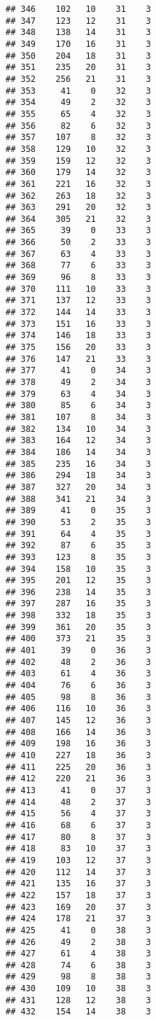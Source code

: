 \documentclass[
]{article}
\begin{document}
\begin{verbatim}
## 346    102   10    31    3
## 347    123   12    31    3
## 348    138   14    31    3
## 349    170   16    31    3
## 350    204   18    31    3
## 351    235   20    31    3
## 352    256   21    31    3
## 353     41    0    32    3
## 354     49    2    32    3
## 355     65    4    32    3
## 356     82    6    32    3
## 357    107    8    32    3
## 358    129   10    32    3
## 359    159   12    32    3
## 360    179   14    32    3
## 361    221   16    32    3
## 362    263   18    32    3
## 363    291   20    32    3
## 364    305   21    32    3
## 365     39    0    33    3
## 366     50    2    33    3
## 367     63    4    33    3
## 368     77    6    33    3
## 369     96    8    33    3
## 370    111   10    33    3
## 371    137   12    33    3
## 372    144   14    33    3
## 373    151   16    33    3
## 374    146   18    33    3
## 375    156   20    33    3
## 376    147   21    33    3
## 377     41    0    34    3
## 378     49    2    34    3
## 379     63    4    34    3
## 380     85    6    34    3
## 381    107    8    34    3
## 382    134   10    34    3
## 383    164   12    34    3
## 384    186   14    34    3
## 385    235   16    34    3
## 386    294   18    34    3
## 387    327   20    34    3
## 388    341   21    34    3
## 389     41    0    35    3
## 390     53    2    35    3
## 391     64    4    35    3
## 392     87    6    35    3
## 393    123    8    35    3
## 394    158   10    35    3
## 395    201   12    35    3
## 396    238   14    35    3
## 397    287   16    35    3
## 398    332   18    35    3
## 399    361   20    35    3
## 400    373   21    35    3
## 401     39    0    36    3
## 402     48    2    36    3
## 403     61    4    36    3
## 404     76    6    36    3
## 405     98    8    36    3
## 406    116   10    36    3
## 407    145   12    36    3
## 408    166   14    36    3
## 409    198   16    36    3
## 410    227   18    36    3
## 411    225   20    36    3
## 412    220   21    36    3
## 413     41    0    37    3
## 414     48    2    37    3
## 415     56    4    37    3
## 416     68    6    37    3
## 417     80    8    37    3
## 418     83   10    37    3
## 419    103   12    37    3
## 420    112   14    37    3
## 421    135   16    37    3
## 422    157   18    37    3
## 423    169   20    37    3
## 424    178   21    37    3
## 425     41    0    38    3
## 426     49    2    38    3
## 427     61    4    38    3
## 428     74    6    38    3
## 429     98    8    38    3
## 430    109   10    38    3
## 431    128   12    38    3
## 432    154   14    38    3

\end{verbatim}
\end{document}
